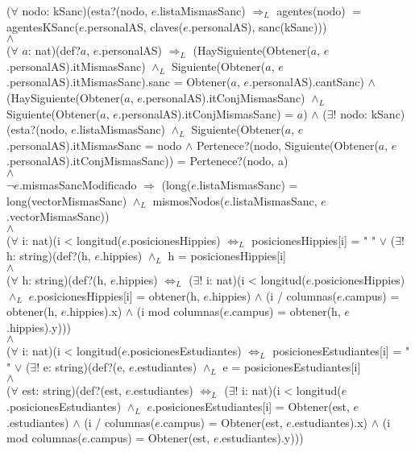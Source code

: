 	($\forall$ nodo: kSanc)(esta?(nodo, $e$.listaMismasSanc) $\Rightarrow_L$ agentes(nodo) $=$ agentesKSanc($e$.personalAS, claves($e$.personalAS), sanc(kSanc)))
	\\
	$\land$
	\\%
	($\forall$ $a$: nat)(def?$a$, $e$.personalAS) $\Rightarrow_L$ (HaySiguiente(Obtener($a$, $e$.personalAS).itMismasSanc) $\land_L$ Siguiente(Obtener($a$, $e$.personalAS).itMismasSanc).sanc = Obtener($a$, $e$.personalAS).cantSanc) $\land$ (HaySiguiente(Obtener($a$, $e$.personalAS).itConjMismasSanc) $\land_L$ Siguiente(Obtener($a$, $e$.personalAS).itConjMismasSanc) = $a$) $\land$ ($\exists!$ nodo: kSanc) (esta?(nodo, $e$.listaMismasSanc) $\land_L$ Siguiente(Obtener($a$, $e$.personalAS).itMismasSanc = nodo $\land$ Pertenece?(nodo,	Siguiente(Obtener($a$, $e$.personalAS).itConjMismasSanc)) = Pertenece?(nodo, a)
	\\
	$\land$
	\\%
	$\neg$$e$.mismasSancModificado $\Rightarrow$ (long($e$.listaMismasSanc) = long(vectorMismasSanc) $\land_L$ mismosNodos($e$.listaMismasSanc, $e$.vectorMismasSanc))
	\\
	$\land$
	\\%
	($\forall$ i: nat)(i < longitud($e$.posicionesHippies) $\Leftrightarrow_L$ posicionesHippies[i] = " " $\lor$ ($\exists!$ h: string)(def?(h, $e$.hippies) $\land_L$ h = posicionesHippies[i]
	\\
	$\land$
	\\%
	($\forall$ h: string)(def?(h, $e$.hippies) $\Leftrightarrow_L$ ($\exists!$ i: nat)(i < longitud($e$.posicionesHippies) $\land_L$ $e$.posicionesHippies[i] = obtener(h, $e$.hippies) $\land$ (i / columnas($e$.campus) = obtener(h, $e$.hippies).x) $\land$ (i mod columnas($e$.campus) = obtener(h, $e$.hippies).y)))
	\\
	$\land$
	\\%
	($\forall$ i: nat)(i < longitud($e$.posicionesEstudiantes) $\Leftrightarrow_L$ posicionesEstudiantes[i] = " " $\lor$ ($\exists!$ e: string)(def?(e, $e$.estudiantes) $\land_L$ e = posicionesEstudiantes[i]
	\\
	$\land$
	\\%
	($\forall$ est: string)(def?(est, $e$.estudiantes) $\Leftrightarrow_L$ ($\exists!$ i: nat)(i < longitud($e$.posicionesEstudiantes) $\land_L$ $e$.posicionesEstudiantes[i] = Obtener(est, $e$.estudiantes) $\land$ (i / columnas($e$.campus) = Obtener(est, $e$.estudiantes).x) $\land$ (i mod columnas($e$.campus) = Obtener(est, $e$.estudiantes).y)))
	\\
	\\


